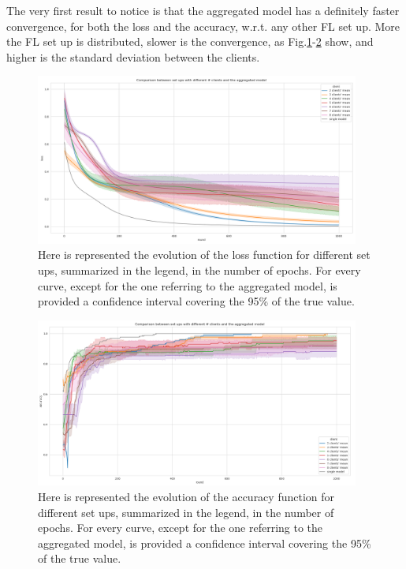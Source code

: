 \documentclass{article} %
\newcounter{other}
\begin{document}
The very first result to notice is that the aggregated model has a definitely faster convergence,
for both the loss and the accuracy, w.r.t. any other FL set up.
More the FL set up is distributed, slower is the convergence, as Fig.\ref{fig3}-\ref{fig4} show, and 
higher is the standard deviation between the clients.
\begin{figure}[!h]
    \centering
        \includegraphics[width=0.95\textwidth, keepaspectratio]{images/loss_red_same.png}
    \caption{Here is represented the evolution of the loss function for different set ups, 
        summarized in the legend, in the number of epochs. For every curve, except for the 
        one referring to the aggregated model, is provided a confidence interval covering the 
        95\% of the true value.}
    \label{fig3}
\end{figure}
\begin{figure}[!h]
    \centering
        \includegraphics[width=0.95\textwidth, keepaspectratio]{images/accuracy_red_same.png}
    \caption{Here is represented the evolution of the accuracy function for different set ups, 
        summarized in the legend, in the number of epochs. For every curve, except for the 
        one referring to the aggregated model, is provided a confidence interval covering the 
        95\% of the true value.}
    \label{fig4}
\end{figure}
\end{document}
